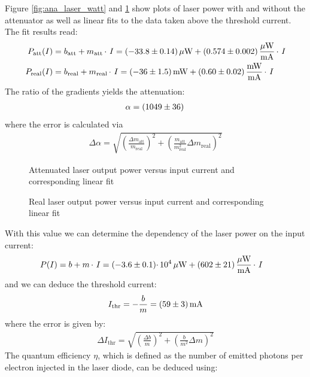 \documentclass{protokoll_en}
\begin{document}
Figure \ref{fig:ana_laser_watt} and \ref{fig:ana_laser_woatt} show plots of laser power with and without the attenuator as well as linear fits to the data taken above the threshold current. The fit results read:
\begin{align}
P_\textrm{att}(I) &= b_\textrm{att} + m_\textrm{att} \,\cdotp\, I = \unit[(-33.8 \pm 0.14)]{\mu W} + \unit[(0.574 \pm 0.002
)]{\frac{\mu W}{mA}}\,\cdotp\, I\\
P_\textrm{real}(I) &= b_\textrm{real} + m_\textrm{real} \,\cdotp\, I =\unit[(-36 \pm 1.5)]{mW} + \unit[(0.60 \pm 0.02
)]{\frac{mW}{mA}}\,\cdotp\, I
\end{align}
The ratio of the gradients yields the attenuation:
\begin{align}
\alpha = \unit[(1049 \pm 36)]{}
\end{align}
where the error is calculated via
\begin{align*}
\Delta \alpha = \sqrt{\left(\frac{\Delta m_\textrm{att}}{m_\textrm{real}}\right)^2 + \left(\frac{m_\textrm{att}}{m^2_\textrm{real}}\Delta m_\textrm{real}\right)^2}
\end{align*}
\begin{figure}[H]
\begin{floatrow}
\ffigbox[0.5\textwidth]{}
{
\resizebox{0.5\textwidth}{!}{
 
}
\caption{Attenuated laser output power versus input current and corresponding linear fit}
\label{fig:ana_laser_watt}
}
\ffigbox[0.5\textwidth]{}
{
\resizebox{0.5\textwidth}{!}{
 
}
\caption{Real laser output power versus input current and corresponding linear fit}
\label{fig:ana_laser_woatt}
}
\end{floatrow}
\end{figure}
With this value we can determine the dependency of the laser power on the input current:
\begin{align}
P(I) &= b + m\,\cdotp\, I=\unit[(-3.6 \pm 0.1)\cdotp 10^{4}]{\mu W} + \unit[(602 \pm 21)]{\frac{\mu W}{mA}}\,\cdotp\, I
\end{align}
and we can deduce the threshold current:
\begin{align}
I_\textrm{thr} = -\frac{b}{m} = \unit[(59 \pm 3)]{mA}
\end{align}
where the error is given by:
\begin{align}
\Delta I_\textrm{thr} = \sqrt{\left(\frac{\Delta b}{m}\right)^2+\left(\frac{b}{m^2}\Delta m\right)^2}
\end{align}
The quantum efficiency $\eta$, which is defined as the number of emitted photons per electron injected in the laser diode, can be deduced using:
\end{document}
